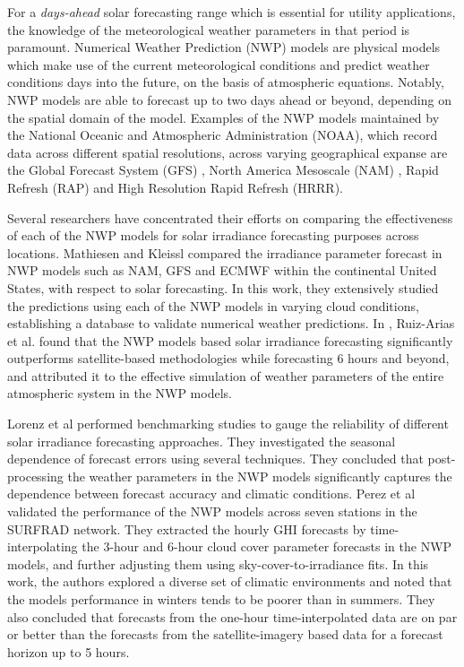 \par For a \textit{days-ahead} solar forecasting range which is essential for utility applications, the knowledge of the meteorological weather parameters in that period is paramount. Numerical Weather Prediction (NWP) models are physical models which make use of the current meteorological conditions and predict weather conditions days into the future, on the basis of atmospheric equations. Notably, NWP models are able to forecast up to two days ahead or beyond, depending on the spatial domain of the model. Examples of the NWP models maintained by the National Oceanic and Atmospheric Administration (NOAA), which record data across different spatial resolutions, across varying geographical expanse are the Global Forecast System (GFS) \cite{litrev_nwp_gfs}, North America Mesoscale (NAM) \cite{litrev_nwp_nam}, Rapid Refresh (RAP) and High Resolution Rapid Refresh (HRRR).

\par Several researchers have concentrated their efforts on comparing the effectiveness of each of the NWP models for solar irradiance forecasting purposes across locations. Mathiesen and Kleissl \cite{litrev_nwp1} compared the irradiance parameter forecast in NWP models such as NAM, GFS and ECMWF within the continental United States, with respect to solar forecasting. In this work, they extensively studied the predictions using each of the NWP models in varying cloud conditions, establishing a database to validate numerical weather predictions. In \cite{litrev_nwp2}, Ruiz-Arias et al. found that the NWP models based solar irradiance forecasting significantly outperforms satellite-based methodologies while forecasting 6 hours and beyond, and attributed it to the effective simulation of weather parameters of the entire atmospheric system in the NWP models.

\par Lorenz et al \cite{litrev_nwp3} performed benchmarking studies to gauge the reliability of different solar irradiance forecasting approaches. They investigated the seasonal dependence of forecast errors using several techniques. They concluded that post-processing the weather parameters in the NWP models significantly captures the dependence between forecast accuracy and climatic conditions. Perez et al \cite{litrev_nwp4} validated the performance of the NWP models across seven stations in the SURFRAD network. They extracted the hourly GHI forecasts by time-interpolating the 3-hour and 6-hour cloud cover parameter forecasts in the NWP models, and further adjusting them using sky-cover-to-irradiance fits. In this work, the authors explored a diverse set of climatic environments and noted that the models performance in winters tends to be poorer than in summers. They also concluded that forecasts from the one-hour time-interpolated data are on par or better than the forecasts from the satellite-imagery based data for a forecast horizon up to 5 hours.

